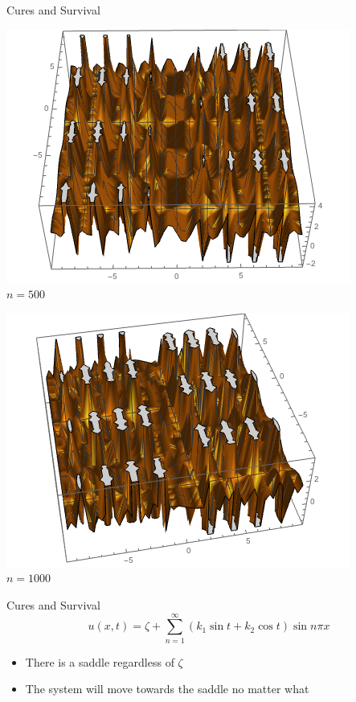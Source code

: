 \documentclass{beamer}
\begin{document}
\begin{frame}{Cures and Survival}
\begin{center}
\begin{minipage}{0.4\textwidth}
\pause\includegraphics[scale=0.3]{cure_0201}\\
$n=500$
\end{minipage}
\begin{minipage}{0.4\textwidth}
\pause\includegraphics[scale=0.3]{cure_03}\\
$n=1000$
\end{minipage}

\end{center}
\end{frame}

\begin{frame}{Cures and Survival}
\[
u(x,t)=\zeta+\sum_{n=1}^{\infty}(k_{1}\sin{t}+k_{2}\cos{t})\sin{n\pi x}
\]
\begin{itemize}
\item There is a saddle regardless of $\zeta$
\pause
\item The system will move towards the saddle no matter what
\end{itemize}
\end{frame}
% 
%
\end{document}
